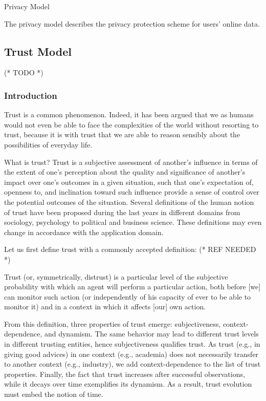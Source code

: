 \documentclass{article}
\begin{document}
Privacy Model



The privacy model describes the privacy protection scheme for users{'} online data.


\subsection{Trust Model}



(* TODO *)


\subsubsection{Introduction}



Trust is a common phenomenon. Indeed, it has been argued that we as humans would not even be able to face the complexities of the world without resorting
to trust, because it is with trust that we are able to reason sensibly about the possibilities of everyday life.



What is trust? Trust is a subjective assessment of another's influence in terms of the extent of one's perception about the quality and significance
of another's impact over one's outcomes in a given situation, such that one's expectation of, openness to, and inclination toward such influence
provide a sense of control over the potential outcomes of the situation. Several definitions of the human notion of trust have been proposed during
the last years in different domains from sociology, psychology to political and business science. These definitions may even change in accordance
with the application domain.



Let us first define trust with a commonly accepted definition: (* REF NEEDED *)



Trust (or, symmetrically, distrust) is a particular level of the subjective probability with which an agent will perform a particular action, both
before [we] can monitor such action (or independently of his capacity of ever to be able to monitor it) and in a context in which it affects [our]
own action.



From this definition, three properties of trust emerge: subjectiveness, context-dependence, and dynamism. The same behavior may lead to different
trust levels in different trusting entities, hence subjectiveness qualifies trust. As trust (e.g., in giving good advices) in one context (e.g.,
academia) does not necessarily transfer to another context (e.g., industry), we add context-dependence to the list of trust properties. Finally,
the fact that trust increases after successful observations, while it decays over time exemplifies its dynamism. As a result, trust evolution must
embed the notion of time.
\end{document}
